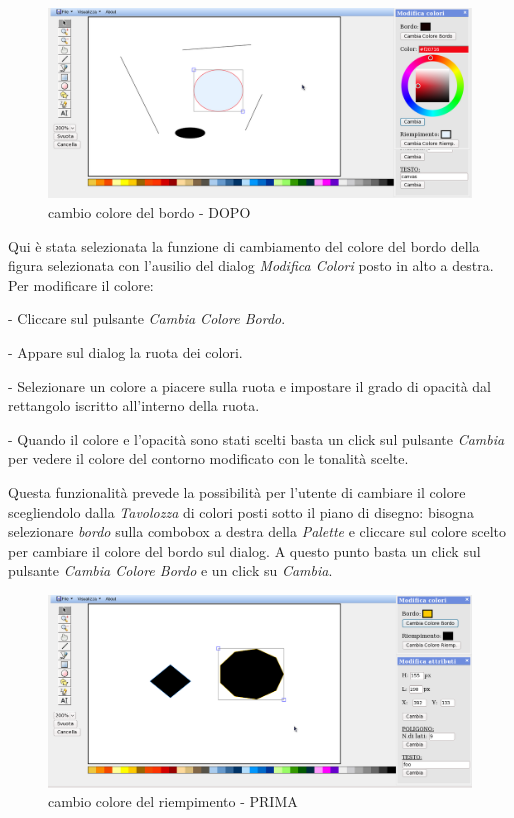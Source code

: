 \begin{figure}[!ht]
\centering
\includegraphics[scale=0.4]{images/colore_bordo_dopo.png}
\caption{cambio colore del bordo  - DOPO}
\end{figure} 


\vspace{100pt}
Qui \`e stata selezionata la funzione di cambiamento del colore del bordo della figura selezionata con l'ausilio del dialog \textit{Modifica Colori} posto in alto a destra. Per modificare il colore: 
\begin{elencopuntato}[\normindent]
\item[-] Cliccare sul pulsante \textit{Cambia Colore Bordo}.
\item[-] Appare sul dialog la ruota dei colori.
\item[-] Selezionare un colore a piacere sulla ruota e impostare il grado di opacit\`a dal rettangolo iscritto all'interno della ruota. 
\item[-]Quando il colore e l'opacit\`a sono stati scelti basta un click sul pulsante \textit{Cambia} per vedere il colore del contorno modificato con le tonalit\`a scelte. 
\end{elencopuntato}
Questa funzionalit\`a prevede la possibilit\`a per l'utente di cambiare il colore scegliendolo dalla \textit{Tavolozza} di colori posti sotto il piano di disegno: bisogna selezionare \textit{bordo} sulla combobox a destra della \textit{Palette} e cliccare sul colore scelto per cambiare il colore del bordo sul dialog. A questo punto basta un click sul pulsante \textit{Cambia Colore Bordo} e un click su \textit{Cambia}.

\begin{figure}[!ht]
\centering
\includegraphics[scale=0.4]{images/colore_riempimento_prima.png}
\caption{cambio colore del riempimento  - PRIMA}
\end{figure} 

